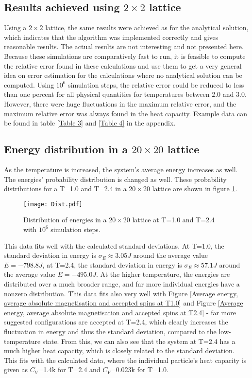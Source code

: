 \documentclass[10pt,a4paper]{article}
\begin{document}
\subsection{Results achieved using $2\times2$ lattice}
Using a $2\times2$ lattice, the same results were achieved as for the analytical solution, which indicates that the algorithm was implemented correctly and gives reasonable results. The actual results are not interesting and not presented here. Because these simulations are comparatively fast to run, it is feasible to compute the relative error found in these calculations and use them to get a very general idea on error estimation for the calculations where no analytical solution can be computed.
Using $10^6$ simulation steps, the relative error could be reduced to less than one percent for all physical quantities for temperatures between 2.0 and 3.0. However, there were huge fluctuations in the maximum relative error, and the maximum relative error was always found in the heat capacity. Example data can be found in table \ref{Table 3} and \ref{Table 4} in the appendix.
\subsection{Energy distribution in a $20\times20$ lattice}
As the temperature is increased, the system's average energy increases as well. The energies' probability distribution is changed as well. These probability distributions for a T=1.0 and T=2.4 in a $20\times20$ lattice are shown in figure \ref{Energy probability distributions in a 20x20 lattice at T1.0  T2.4}.
\begin{figure}[H]
\texttt{[image: Dist.pdf]}
\caption[Energy probability distributions in a $20\times20$ lattice at T=1.0 \& T=2.4]{Distribution of energies in a $20\times20$ lattice at T=1.0 and T=2.4 with $10^6$ simulation steps.}\label{Energy probability distributions in a 20x20 lattice at T1.0  T2.4}
\end{figure}
This data fits well with the calculated standard deviations. At T=1.0, the standard deviation in energy is $\sigma_E\approx3.05J$ around the average value $E=-798.8J$, at T=2.4, the standard deviation in energy is $\sigma_E\approx57.1J$ around the average value $E=-495.0J$. At the higher temperature, the energies are distributed over a much broader range, and far more individual energies have a nonzero distribution. This data fits also very well with Figure \ref{Average energy, average absolute magnetisation and accepted spins at T1.0} and Figure \ref{Average energy, average absolute magnetisation and accepted spins at T2.4} - far more suggested configurations are accepted at T=2.4, which clearly increases the fluctuation in energy and thus the standard deviation, compared to the low-temperature state. From this, we can also see that the system at T=2.4 has a much higher heat capacity, which is closely related to the standard deviation. This fits with the calculated data, where the individual particle's heat capacity is given as $C_V$=1.4k for T=2.4 and $C_V$=0.023k for T=1.0. 
\end{document}
